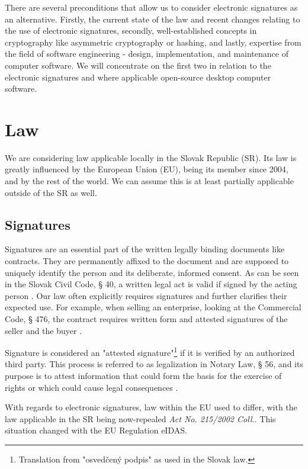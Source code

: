 \documentclass[thesismargins, english, thesislinespacing, onelinechapterstyle, upjsfrontpage]{rnthesis}
\begin{document}
There are several preconditions that allow us to consider electronic signatures as an alternative.
Firstly, the current state of the law and recent changes relating to the use of electronic signatures, secondly, well-established concepts in cryptography like asymmetric cryptography or hashing, and lastly, expertise from the field of software engineering - design, implementation, and maintenance of computer software.
We will concentrate on the first two in relation to the electronic signatures and where applicable open-source desktop computer software.

\iffalse %
TODO: Think about adding section on handwritten signatures
\fi

\section{Law}

We are considering law applicable locally in the Slovak Republic (SR).
Its law is greatly influenced by the European Union (EU), being its member since 2004, and by the rest of the world.
We can assume this is at least partially applicable outside of the SR as well.

\subsection{Signatures}

Signatures are an essential part of the written legally binding documents like contracts.
They are permanently affixed to the document and are supposed to uniquely identify the person and its deliberate, informed consent.
As can be seen in the Slovak Civil Code, § 40, a written legal act is valid if signed by the acting person \cite{civilcode}.
Our law often explicitly requires signatures and further clarifies their expected use.
For example, when selling an enterprise, looking at the Commercial Code, § 476, the contract requires written form and attested signatures of the seller and the buyer \cite{commercialcode}.

Signature is considered an "attested signature"\footnote{Translation from "osvedčený podpis" as used in the Slovak law.} if it is verified by an authorized third party.
This process is referred to as legalization in Notary Law, § 56, and its purpose is to attest information that could form the basis for the exercise of rights or which could cause legal consequences \cite{notarylaw}.

With regards to electronic signatures, law within the EU used to differ, with the law applicable in the SR being now-repealed \textit{Act No. 215/2002 Coll.}. This situation changed with the EU Regulation eIDAS.
\end{document}
